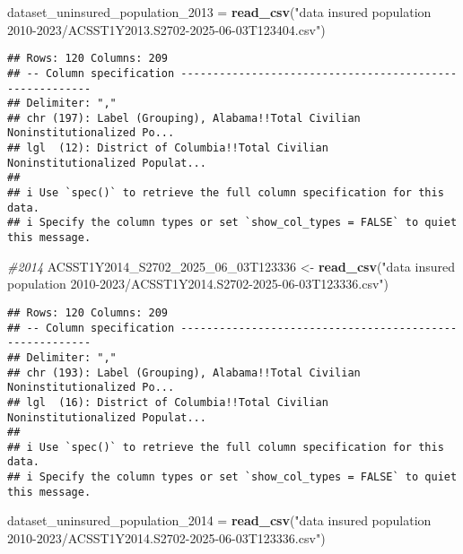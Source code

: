 \documentclass[
]{article}
\newenvironment{Shaded}{\begin{snugshade}}{\end{snugshade}}
\newcommand{\CommentTok}[1]{\textcolor[rgb]{0.56,0.35,0.01}{\textit{#1}}}
\newcommand{\FunctionTok}[1]{\textcolor[rgb]{0.13,0.29,0.53}{\textbf{#1}}}
\newcommand{\NormalTok}[1]{#1}
\newcommand{\OtherTok}[1]{\textcolor[rgb]{0.56,0.35,0.01}{#1}}
\newcommand{\StringTok}[1]{\textcolor[rgb]{0.31,0.60,0.02}{#1}}
\begin{document}
\begin{Shaded}
\begin{Highlighting}[]
\NormalTok{dataset\_uninsured\_population\_2013 }\OtherTok{=} \FunctionTok{read\_csv}\NormalTok{(}\StringTok{"data insured population 2010{-}2023/ACSST1Y2013.S2702{-}2025{-}06{-}03T123404.csv"}\NormalTok{)}
\end{Highlighting}
\end{Shaded}

\begin{verbatim}
## Rows: 120 Columns: 209
## -- Column specification --------------------------------------------------------
## Delimiter: ","
## chr (197): Label (Grouping), Alabama!!Total Civilian Noninstitutionalized Po...
## lgl  (12): District of Columbia!!Total Civilian Noninstitutionalized Populat...
## 
## i Use `spec()` to retrieve the full column specification for this data.
## i Specify the column types or set `show_col_types = FALSE` to quiet this message.
\end{verbatim}

\begin{Shaded}
\begin{Highlighting}[]
\CommentTok{\#2014}
\NormalTok{ACSST1Y2014\_S2702\_2025\_06\_03T123336 }\OtherTok{\textless{}{-}} \FunctionTok{read\_csv}\NormalTok{(}\StringTok{"data insured population 2010{-}2023/ACSST1Y2014.S2702{-}2025{-}06{-}03T123336.csv"}\NormalTok{)}
\end{Highlighting}
\end{Shaded}

\begin{verbatim}
## Rows: 120 Columns: 209
## -- Column specification --------------------------------------------------------
## Delimiter: ","
## chr (193): Label (Grouping), Alabama!!Total Civilian Noninstitutionalized Po...
## lgl  (16): District of Columbia!!Total Civilian Noninstitutionalized Populat...
## 
## i Use `spec()` to retrieve the full column specification for this data.
## i Specify the column types or set `show_col_types = FALSE` to quiet this message.
\end{verbatim}

\begin{Shaded}
\begin{Highlighting}[]
\NormalTok{dataset\_uninsured\_population\_2014 }\OtherTok{=} \FunctionTok{read\_csv}\NormalTok{(}\StringTok{"data insured population 2010{-}2023/ACSST1Y2014.S2702{-}2025{-}06{-}03T123336.csv"}\NormalTok{)}
\end{Highlighting}
\end{Shaded}
\end{document}
